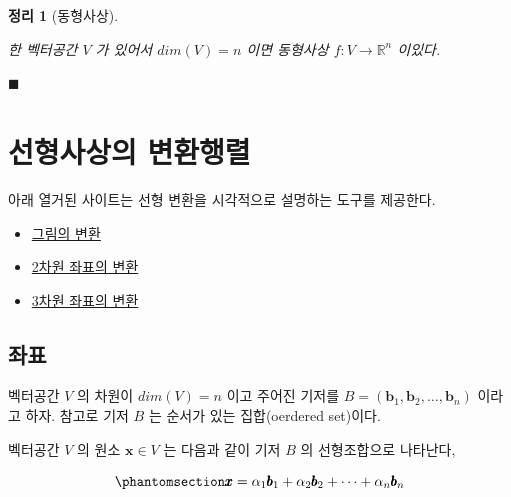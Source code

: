\documentclass[
  11pt,
  a4paper,
  oneside]{scrbook}
\providecommand{\tightlist}{%
  \setlength{\itemsep}{0pt}\setlength{\parskip}{0pt}}\usepackage{longtable,booktabs,array}
\newcommand{\RR}{\mathbb{R}}
\theoremstyle{definition}
\theoremstyle{definition}
\theoremstyle{plain}
\newtheorem{theorem}{정리}[chapter]
\theoremstyle{remark}
\begin{document}
\begin{theorem}[동형사상]\protect\hypertarget{thm-isomorphism}{}\label{thm-isomorphism}

한 벡터공간 \(V\) 가 있어서 \(dim(V)=n\) 이면 동형사상
\(f :V \rightarrow \RR^n\) 이있다.

\(\blacksquare\)

\end{theorem}


\chapter{선형사상의 변환행렬}\label{linear_transform}

\begin{tcolorbox}[enhanced jigsaw, colback=white, colframe=quarto-callout-note-color-frame, opacityback=0, toprule=.15mm, leftrule=.75mm, titlerule=0mm, opacitybacktitle=0.6, title=\textcolor{quarto-callout-note-color}{\faInfo}\hspace{0.5em}{노트}, colbacktitle=quarto-callout-note-color!10!white, breakable, bottomrule=.15mm, bottomtitle=1mm, toptitle=1mm, arc=.35mm, left=2mm, rightrule=.15mm, coltitle=black]

아래 열거된 사이트는 선형 변환을 시각적으로 설명하는 도구를 제공한다.

\begin{itemize}
\tightlist
\item
  \href{https://www.geogebra.org/m/pDU4peV5}{그림의 변환}
\item
  \href{https://bossmaths.com/matrices-4/\#4a}{2차원 좌표의 변환}
\item
  \href{https://bossmaths.com/matrices-8/}{3차원 좌표의 변환}
\end{itemize}

\end{tcolorbox}

\section{좌표}\label{uxc88cuxd45c}

벡터공간 \(V\) 의 차원이 \(dim(V)=n\) 이고 주어진 기저를
\(B = (\pmb b_1, \pmb b_2, \dots, \pmb b_n)\) 이라고 하자. 참고로 기저
\(B\) 는 순서가 있는 집합(oerdered set)이다.

벡터공간 \(V\) 의 원소 \(\pmb x \in V\) 는 다음과 같이 기저 \(B\) 의
선형조합으로 나타난다,

\begin{equation}\phantomsection\label{eq-coordi-def}{ \pmb x = \alpha_1 \pmb b_1 + \alpha_2 \pmb b_2 + \dots + \alpha_n \pmb b_n }\end{equation}
\end{document}
